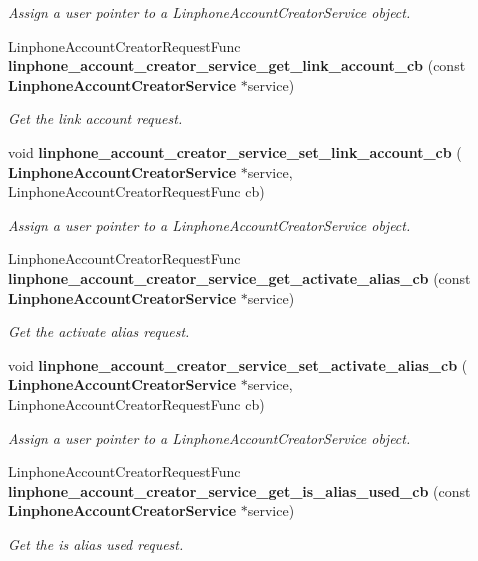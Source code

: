 \begin{DoxyCompactItemize}
\begin{DoxyCompactList}\small\item\em Assign a user pointer to a Linphone\+Account\+Creator\+Service object. \end{DoxyCompactList}\item 
Linphone\+Account\+Creator\+Request\+Func \textbf{ linphone\+\_\+account\+\_\+creator\+\_\+service\+\_\+get\+\_\+link\+\_\+account\+\_\+cb} (const \textbf{ Linphone\+Account\+Creator\+Service} $\ast$service)
\begin{DoxyCompactList}\small\item\em Get the link account request. \end{DoxyCompactList}\item 
void \textbf{ linphone\+\_\+account\+\_\+creator\+\_\+service\+\_\+set\+\_\+link\+\_\+account\+\_\+cb} (\textbf{ Linphone\+Account\+Creator\+Service} $\ast$service, Linphone\+Account\+Creator\+Request\+Func cb)
\begin{DoxyCompactList}\small\item\em Assign a user pointer to a Linphone\+Account\+Creator\+Service object. \end{DoxyCompactList}\item 
Linphone\+Account\+Creator\+Request\+Func \textbf{ linphone\+\_\+account\+\_\+creator\+\_\+service\+\_\+get\+\_\+activate\+\_\+alias\+\_\+cb} (const \textbf{ Linphone\+Account\+Creator\+Service} $\ast$service)
\begin{DoxyCompactList}\small\item\em Get the activate alias request. \end{DoxyCompactList}\item 
void \textbf{ linphone\+\_\+account\+\_\+creator\+\_\+service\+\_\+set\+\_\+activate\+\_\+alias\+\_\+cb} (\textbf{ Linphone\+Account\+Creator\+Service} $\ast$service, Linphone\+Account\+Creator\+Request\+Func cb)
\begin{DoxyCompactList}\small\item\em Assign a user pointer to a Linphone\+Account\+Creator\+Service object. \end{DoxyCompactList}\item 
Linphone\+Account\+Creator\+Request\+Func \textbf{ linphone\+\_\+account\+\_\+creator\+\_\+service\+\_\+get\+\_\+is\+\_\+alias\+\_\+used\+\_\+cb} (const \textbf{ Linphone\+Account\+Creator\+Service} $\ast$service)
\begin{DoxyCompactList}\small\item\em Get the is alias used request. \end{DoxyCompactList}\item 

\end{DoxyCompactItemize}
